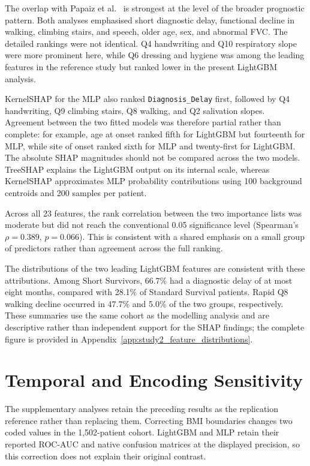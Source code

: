 The overlap with Papaiz et al.~\cite{Papaiz2024} is strongest at the level of the broader prognostic pattern. Both analyses emphasised short diagnostic delay, functional decline in walking, climbing stairs, and speech, older age, sex, and abnormal FVC. The detailed rankings were not identical. Q4 handwriting and Q10 respiratory slope were more prominent here, while Q6 dressing and hygiene was among the leading features in the reference study but ranked lower in the present LightGBM analysis.

KernelSHAP for the MLP also ranked \texttt{Diagnosis\_Delay} first, followed by Q4 handwriting, Q9 climbing stairs, Q8 walking, and Q2 salivation slopes. Agreement between the two fitted models was therefore partial rather than complete: for example, age at onset ranked fifth for LightGBM but fourteenth for MLP, while site of onset ranked sixth for MLP and twenty-first for LightGBM. The absolute SHAP magnitudes should not be compared across the two models. TreeSHAP explains the LightGBM output on its internal scale, whereas KernelSHAP approximates MLP probability contributions using 100 background centroids and 200 samples per patient.

Across all 23 features, the rank correlation between the two importance lists was moderate but did not reach the conventional 0.05 significance level (Spearman's $\rho=0.389$, $p=0.066$). This is consistent with a shared emphasis on a small group of predictors rather than agreement across the full ranking.

The distributions of the two leading LightGBM features are consistent with these attributions. Among Short Survivors, 66.7\% had a diagnostic delay of at most eight months, compared with 28.1\% of Standard Survival patients. Rapid Q8 walking decline occurred in 47.7\% and 5.0\% of the two groups, respectively. These summaries use the same cohort as the modelling analysis and are descriptive rather than independent support for the SHAP findings; the complete figure is provided in Appendix~\ref{app:study2_feature_distributions}.

\section{Temporal and Encoding Sensitivity}
\label{sec:s2r_temporal_sensitivity}

The supplementary analyses retain the preceding results as the replication reference rather than replacing them. Correcting BMI boundaries changes two coded values in the 1,502-patient cohort. LightGBM and MLP retain their reported ROC-AUC and native confusion matrices at the displayed precision, so this correction does not explain their original contrast.

